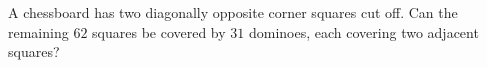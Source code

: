 A chessboard has two diagonally opposite corner squares cut off. Can the remaining $62$ squares be covered by $31$ dominoes, each covering two adjacent squares?
